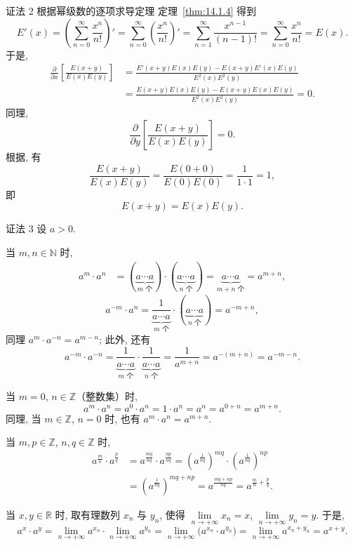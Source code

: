 证法 2 根据幂级数的逐项求导定理 定理~\ref{thm:14.1.4} 得到
\[
  E'(x)=\left(\sum_{n=0}^{\infty}\frac{x^{n}}{n!}\right)'=\sum_{n=0}^{\infty}\left(\frac{x^{n}}{n!}\right)'=\sum_{n=1}^{\infty}\frac{x^{n-1}}{(n-1)!}=\sum_{n=0}^{\infty}\frac{x^{n}}{n!}=E(x).
\]
于是,
\[
  \begin{aligned}
    \frac{\partial}{\partial x}\left[\frac{E(x+y)}{E(x)E(y)}\right]&=\frac{E'(x+y)E(x)E(y)-E(x+y)E'(x)E(y)}{E^{2}(x)E^{2}(y)}\\
    &=\frac{E(x+y)E(x)E(y)-E(x+y)E(x)E(y)}{E^{2}(x)E^{2}(y)}=0.
  \end{aligned}
\]
同理,
\[
  \frac{\partial}{\partial y}\left[\frac{E(x+y)}{E(x)E(y)}\right]=0.
\]
根据, 有
\[
  \frac{E(x+y)}{E(x)E(y)}=\frac{E(0+0)}{E(0)E(0)}=\frac{1}{1\cdot1}=1,
\]
即
\[
  E(x+y)=E(x)E(y).
\]

证法 3 设 $a>0$.

当 $m,n\in\mathbb{N}$ 时,
\[
  \begin{aligned}
    a^{m}\cdot a^{n}&=(\underbrace{a\cdots a}_{\text{$m$ 个}})\cdot(\underbrace{a\cdots a}_{\text{$n$ 个}})=\underbrace{a\cdots a}_{\text{$m+n$ 个}}=a^{m+n},
  \end{aligned}
\]
\[
  a^{-m}\cdot a^{n}=\underbrace{\frac{1}{a\cdots a}}_{\text{$m$ 个}}\cdot(\underbrace{a\cdots a}_{\text{$n$ 个}})=a^{-m+n},
\]
同理 $a^{m}\cdot a^{-n}=a^{m-n}$; 此外, 还有
\[
  a^{-m}\cdot a^{-n}=\underbrace{\frac{1}{a\cdots a}}_{\text{$m$ 个}}\cdot\underbrace{\frac{1}{a\cdots a}}_{\text{$n$ 个}}=\frac{1}{a^{m+n}}=a^{-(m+n)}=a^{-m-n}.
\]

当 $m=0$, $n\in\mathbb{Z}$（整数集）时,
\[
  a^{m}\cdot a^{n}=a^{0}\cdot a^{n}=1\cdot a^{n}=a^{n}=a^{0+n}=a^{m+n}.
\]
同理, 当 $m\in\mathbb{Z}$, $n=0$ 时, 也有 $a^{m}\cdot a^{n}=a^{m+n}$.

当 $m,p\in\mathbb{Z}$, $n,q\in\mathbb{Z}$ 时,
\[
  \begin{aligned}
    a^{\frac{m}{n}}\cdot a^{\frac{p}{q}}&=a^{\frac{mq}{nq}}\cdot a^{\frac{np}{nq}}=\left(a^{\frac{1}{nq}}\right)^{mq}\cdot\left(a^{\frac{1}{nq}}\right)^{np}\\
    &=\left(a^{\frac{1}{nq}}\right)^{mq+np}=a^{\frac{mq+np}{nq}}=a^{\frac{m}{n}+\frac{p}{q}}.
  \end{aligned}
\]

当 $x,y\in\mathbb{R}$ 时, 取有理数列 $x_{n}$ 与 $y_{n}$, 使得 $\lim\limits_{n\to+\infty}x_{n}=x$, $\lim\limits_{n\to+\infty}y_{n}=y$. 于是,
\[
  a^{x}\cdot a^{y}=\lim_{n\to+\infty}a^{x_{n}}\cdot\lim_{n\to+\infty}a^{y_{n}}=\lim_{n\to+\infty}\bigl(a^{x_{n}}\cdot a^{y_{n}}\bigr)=\lim_{n\to+\infty}a^{x_{n}+y_{n}}=a^{x+y}.
\]

